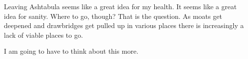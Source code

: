 Leaving Ashtabula seems like a great idea for my health. It seems like a
great idea for sanity. Where to go, though? That is the question. As
moats get deepened and drawbridges get pulled up in various places there
is increasingly a lack of viable places to go.

I am going to have to think about this more.
